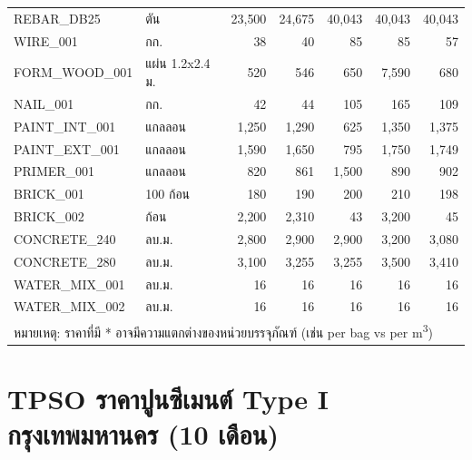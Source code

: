 \begin{longtable}{llrrrrr}
REBAR\_DB25 & ตัน & 23{,}500 & 24{,}675 & 40{,}043 & 40{,}043 & 40{,}043 \\
WIRE\_001 & กก. & 38 & 40 & 85 & 85 & 57 \\
FORM\_WOOD\_001 & แผ่น 1.2x2.4 ม. & 520 & 546 & 650 & 7{,}590 & 680 \\
NAIL\_001 & กก. & 42 & 44 & 105 & 165 & 109 \\
PAINT\_INT\_001 & แกลลอน & 1{,}250 & 1{,}290 & 625 & 1{,}350 & 1{,}375 \\
PAINT\_EXT\_001 & แกลลอน & 1{,}590 & 1{,}650 & 795 & 1{,}750 & 1{,}749 \\
PRIMER\_001 & แกลลอน & 820 & 861 & 1{,}500 & 890 & 902 \\
BRICK\_001 & 100 ก้อน & 180 & 190 & 200 & 210 & 198 \\
BRICK\_002 & ก้อน & 2{,}200 & 2{,}310 & 43 & 3{,}200 & 45 \\
CONCRETE\_240 & ลบ.ม. & 2{,}800 & 2{,}900 & 2{,}900 & 3{,}200 & 3{,}080 \\
CONCRETE\_280 & ลบ.ม. & 3{,}100 & 3{,}255 & 3{,}255 & 3{,}500 & 3{,}410 \\
WATER\_MIX\_001 & ลบ.ม. & 16 & 16 & 16 & 16 & 16 \\
WATER\_MIX\_002 & ลบ.ม. & 16 & 16 & 16 & 16 & 16 \\
\bottomrule
\multicolumn{7}{l}{\small * หมายเหตุ: ราคาที่มี * อาจมีความแตกต่างของหน่วยบรรจุภัณฑ์ (เช่น per bag vs per m\textsuperscript{3})} \\
\end{longtable}
\endgroup

\section{TPSO ราคาปูนซีเมนต์ Type I กรุงเทพมหานคร (10 เดือน)}

